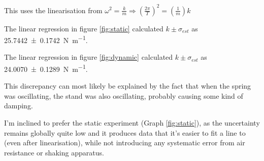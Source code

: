 \documentclass[a4paper,11pt]{article}
\begin{document}
This uses the linearisation from
$\displaystyle\omega^2 = \frac km \Rightarrow
    \left(\frac{2\pi}{T}\right)^2 = \left(\frac 1m\right) k$

The linear regression in figure \ref{fig:static} calculated
$k \pm \sigma_{est}$ as \SI{25.7442 \pm 0.1742}{\newton \per \metre}.

The linear regression in figure \ref{fig:dynamic} calculated
$k \pm \sigma_{est}$ as \SI{24.0070 \pm 0.1289}{\newton \per \metre}.

This discrepancy can most likely be explained by the fact that when the spring
was oscillating, the stand was also oscillating, probably causing some kind of
damping.

I'm inclined to prefer the static experiment (Graph \ref{fig:static}), as the
uncertainty remains globally quite low and it produces data that it's easier to
fit a line to (even after linearisation), while not introducing any systematic
error from air resistance or shaking apparatus.
\end{document}
